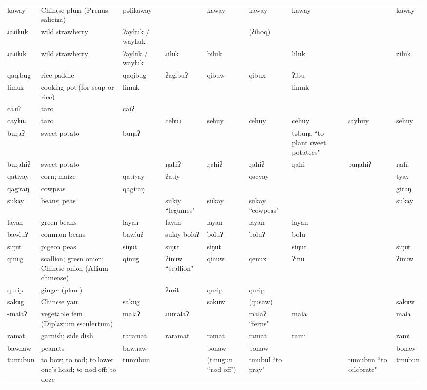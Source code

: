 \begin{landscape}
\begin{longtable}{*{9}{p{}}}
\text{*}kaway & Chinese plum (Prunus salicina) & pəlikaway &  & kaway & kaway & kaway &  & kaway\\
\text{*}ɹaɹihuk & wild strawberry & ʔayhuk / wayhuk &  &  & (ʔihoq) &  &  & \\
\text{*}ɹaɹiluk & wild strawberry & ʔayluk / wayluk & ɹiluk & biluk &  & liluk &  & ziluk\\
\text{*}qaqibug & rice paddle & qaqibug & ʔagibuʔ & qibuw & qibux & ʔibu &  & \\
\text{*}limuk & cooking pot (for soup or rice) & limuk &  &  &  & limuk &  & \\
\text{*}caɹiʔ & taro & caiʔ &  &  &  &  &  & \\
\text{*}cayhuɹ & taro &  & cehuɹ & sehuy & cehuy & cehuy & sayhuy & sehuy\\
\text{*}buŋaʔ & sweet potato & buŋaʔ &  &  &  & təbuŋa ``to plant sweet potatoes" &  & \\
\text{*}buŋahiʔ & sweet potato &  & ŋahiʔ & ŋahiʔ & ŋahiʔ & ŋahi & buŋahiʔ & ŋahi\\
\text{*}qatiyay & corn; maize & qatiyay & ʔatiy &  & qəcyay &  &  & tyay\\
\text{*}qagiraŋ & cowpeas & qagiraŋ &  &  &  &  &  & giraŋ\\
\text{*}sukay & beans; peas &  & sukiy ``legumes" & sukay & sukay ``cowpeas" &  &  & sukay\\
\text{*}layan & green beans & layan & layan & layan & layan & layan &  & \\
\text{*}bawluʔ & common beans & bawluʔ & sukiy boluʔ & boluʔ & boluʔ & bolu &  & \\
\text{*}siŋut & pigeon peas & siŋut & siŋut & siŋut &  & siŋut &  & siŋut\\
\text{*}qinug & scallion; green onion; Chinese onion (Allium chinense) & qinug & ʔinuw ``scallion" & qinuw & qenux & ʔinu &  & ʔinuw\\
\text{*}qurip & ginger (plant) &  & ʔurik & qurip & qurip &  &  & \\
\text{*}sakug & Chinese yam & sakug &  & sakuw & (qusaw) &  &  & sakuw\\
\text{*}-malaʔ & vegetable fern (Diplazium esculentum) & malaʔ & ɹumalaʔ &  & malaʔ ``ferns" & mala &  & mala\\
\text{*}ramat & garnish; side dish & raramat & raramat & ramat & ramat & rami &  & rami\\
\text{*}bawnaw & peanuts & bawnaw &  & bonaw & bonaw &  &  & bonaw\\
\text{*}tumubun & to bow; to nod; to lower one's head; to nod off; to doze & tumubun &  & (tmugun ``nod off") & tmubul ``to pray" &  & tumubun ``to celebrate" & tmubun\\

\end{longtable}
\end{landscape}
